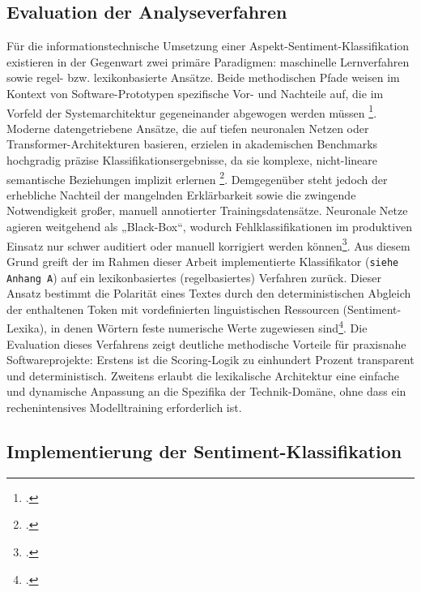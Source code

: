 \documentclass[12pt]{article}
\begin{document}
\subsection{Evaluation der Analyseverfahren}
Für die informationstechnische Umsetzung einer Aspekt-Sentiment-Klassifikation existieren in der Gegenwart zwei primäre Paradigmen: maschinelle Lernverfahren sowie regel- bzw. lexikonbasierte Ansätze. Beide methodischen Pfade weisen im Kontext von Software-Prototypen spezifische Vor- und Nachteile auf, die im Vorfeld der Systemarchitektur gegeneinander abgewogen werden müssen \footcite[268]{taboada-2011}.
Moderne datengetriebene Ansätze, die auf tiefen neuronalen Netzen oder Transformer-Architekturen basieren, erzielen in akademischen Benchmarks hochgradig präzise Klassifikationsergebnisse, da sie komplexe, nicht-lineare semantische Beziehungen implizit erlernen \footcite[2980]{bharathi-2025}. Demgegenüber steht jedoch der erhebliche Nachteil der mangelnden Erklärbarkeit sowie die zwingende Notwendigkeit großer, manuell annotierter Trainingsdatensätze. Neuronale Netze agieren weitgehend als „Black-Box“, wodurch Fehlklassifikationen im produktiven Einsatz nur schwer auditiert oder manuell korrigiert werden können\footcite[2]{le-2026}.
Aus diesem Grund greift der im Rahmen dieser Arbeit implementierte Klassifikator (\texttt{siehe Anhang A}) auf ein lexikonbasiertes (regelbasiertes) Verfahren zurück. Dieser Ansatz bestimmt die Polarität eines Textes durch den deterministischen Abgleich der enthaltenen Token mit vordefinierten linguistischen Ressourcen (Sentiment-Lexika), in denen Wörtern feste numerische Werte zugewiesen sind\footcite[268]{taboada-2011}. Die Evaluation dieses Verfahrens zeigt deutliche methodische Vorteile für praxisnahe Softwareprojekte: Erstens ist die Scoring-Logik zu einhundert Prozent transparent und deterministisch. Zweitens erlaubt die lexikalische Architektur eine einfache und dynamische Anpassung an die Spezifika der Technik-Domäne, ohne dass ein rechenintensives Modelltraining erforderlich ist.
\subsection{Implementierung der Sentiment-Klassifikation}
\label{subsec:implementierung_sentiment}
\end{document}
